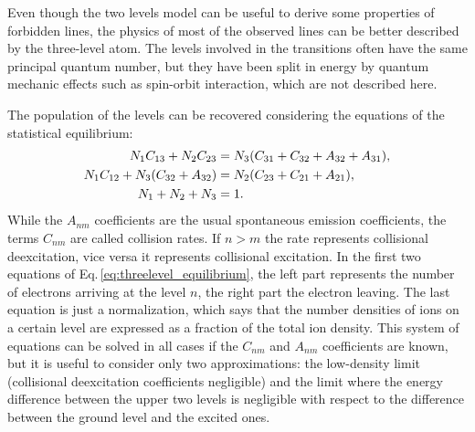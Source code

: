 \documentclass[../main.tex]{subfiles}
\begin{document}
Even though the two levels model can be useful to derive some properties of forbidden lines, the physics of most of the observed lines can be better described by the three-level atom.
The levels involved in the transitions often have the same principal quantum number, but they have been split in energy by quantum mechanic effects such as spin-orbit interaction, which are not described here.

The population of the levels can be recovered considering the equations of the statistical equilibrium:
\begin{align}
    \label{eq:threelevel_equilibrium}
    N_1 C_{13}+N_2 C_{23} &= N_3(C_{31}+C_{32}+A_{32}+A_{31}), \notag\\
    N_1 C_{12}+N_3(C_{32}+A_{32}) &= N_2(C_{23}+C_{21}+A_{21}),\\
    N_1+N_2+N_3 &= 1. \notag
\end{align}
While the $A_{nm}$ coefficients are the usual spontaneous emission coefficients, the terms $C_{nm}$ are called collision rates.
If $n>m$ the rate represents collisional deexcitation, vice versa it represents collisional excitation.
In the first two equations of Eq.\,\ref{eq:threelevel_equilibrium}, the left part represents the number of electrons arriving at the level $n$, the right part the electron leaving.
The last equation is just a normalization, which says that the number densities of ions on a certain level are expressed as a fraction of the total ion density.
This system of equations can be solved in all cases if the $C_{nm}$ and $A_{nm}$ coefficients are known, but it is useful to consider only two approximations: the low-density limit (collisional deexcitation coefficients negligible) and the limit where the energy difference between the upper two levels is negligible with respect to the difference between the ground level and the excited ones.
\end{document}
